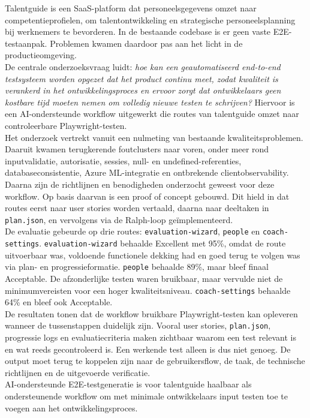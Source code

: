 Talentguide is een SaaS-platform dat personeelsgegevens omzet naar competentieprofielen, om talentontwikkeling en strategische personeelsplanning bij werknemers te bevorderen. In de bestaande codebase is er geen vaste E2E-testaanpak. Problemen kwamen daardoor pas aan het licht in de productieomgeving.
\bigskip
\\
De centrale onderzoeksvraag luidt: \textit{hoe kan een geautomatiseerd end-to-end testsysteem worden opgezet dat het product continu meet, zodat kwaliteit is verankerd in het ontwikkelingsproces en ervoor zorgt dat ontwikkelaars geen kostbare tijd moeten nemen om volledig nieuwe testen te schrijven?} Hiervoor is een AI-ondersteunde workflow uitgewerkt die routes van talentguide omzet naar controleerbare Playwright-testen.
\bigskip
\\
Het onderzoek vertrekt vanuit een nulmeting van bestaande kwaliteitsproblemen. Daaruit kwamen terugkerende foutclusters naar voren, onder meer rond inputvalidatie, autorisatie, sessies, null- en undefined-referenties, databaseconsistentie, Azure ML-integratie en ontbrekende clientobservability. Daarna zijn de richtlijnen en benodigheden onderzocht geweest voor deze workflow. Op basis daarvan is een proof of concept gebouwd. Dit hield in dat routes eerst naar user stories worden vertaald, daarna naar deeltaken in \texttt{plan.json}, en vervolgens via de Ralph-loop geïmplementeerd.
\bigskip
\\
De evaluatie gebeurde op drie routes: \texttt{evaluation-wizard}, \texttt{people} en \texttt{coach-settings}. \texttt{evaluation-wizard} behaalde Excellent met 95\%, omdat de route uitvoerbaar was, voldoende functionele dekking had en goed terug te volgen was via plan- en progressieformatie. \texttt{people} behaalde 89\%, maar bleef finaal Acceptable. De afzonderlijke testen waren bruikbaar, maar vervulde niet de minimumvereisten voor een hoger kwaliteitsniveau. \texttt{coach-settings} behaalde 64\% en bleef ook Acceptable.
\bigskip
\\
De resultaten tonen dat de workflow bruikbare Playwright-testen kan opleveren wanneer de tussenstappen duidelijk zijn. Vooral user stories, \texttt{plan.json}, progressie logs en evaluatiecriteria maken zichtbaar waarom een test relevant is en wat reeds gecontroleerd is. Een werkende test alleen is dus niet genoeg. De output moet terug te koppelen zijn naar de gebruikersflow, de taak, de technische richtlijnen en de uitgevoerde verificatie.
\bigskip
\\
AI-ondersteunde E2E-testgeneratie is voor talentguide haalbaar als ondersteunende workflow om met minimale ontwikkelaars input testen toe te voegen aan het ontwikkelingsproces.
